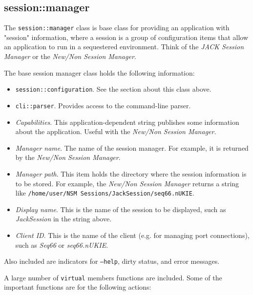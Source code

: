 \subsection{session::manager}
\label{subsec:session_namespace_manager}

   The \texttt{session::manager} class is base class for providing an
   application with "session" information, where a session is a group of
   configuration items that allow an application to run in a sequestered
   environment. Think of the \textsl{JACK Session Manager} or the 
   \textsl{New/Non Session Manager}.

   The base session manager class holds the following information:

   \begin{itemize}
      \item \texttt{session::configuration}.
         See the section about this class above.
      \item \texttt{cli::parser}.
         Provides access to the command-line parser.
      \item \textsl{Capabilities}.
         This application-dependent string publishes some information about
         the application. Useful with the
         \textsl{New/Non Session Manager}.
      \item \textsl{Manager name}.
         The name of the session manager. For example, it is returned by the
         \textsl{New/Non Session Manager}.
      \item \textsl{Manager path}.
         This item holds the directory where the session information is to
         be stored.
         For example, the \textsl{New/Non Session Manager} returns a string
         like
         \texttt{/home/user/NSM Sessions/JackSession/seq66.nUKIE}.
      \item \textsl{Display name}.
         This is the name of the session to be displayed, such as
         \textsl{JackSession} in the string above.
      \item \textsl{Client ID}.
         This is the name of the client (e.g. for managing port
         connections), such as \textsl{Seq66} or \textsl{seq66.nUKIE}.
   \end{itemize}

   Also included are indicators for \texttt{--help}, dirty status, and error
   messages.

   A large number of \texttt{virtual} members functions are included.
   Some of the important functions are for the following actions:

